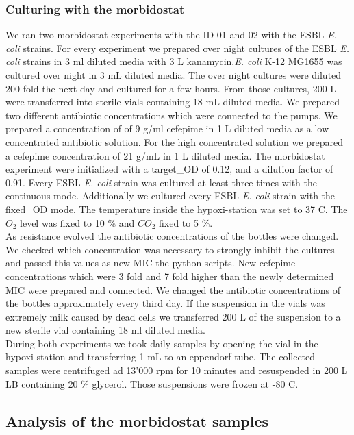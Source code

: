 \subsubsection{Culturing with the morbidostat}
We ran two morbidostat experiments with the ID 01 and 02 with the ESBL \textit{E. coli} strains. For every experiment we prepared over night cultures of the ESBL \textit{E. coli} strains in 3 ml diluted media with 3 \textmu L kanamycin.\textit{E. coli} K-12 MG1655 was cultured over night in 3 mL diluted media. The over night cultures were diluted 200 fold the next day and cultured for a few hours. From those cultures, 200 \textmu L were transferred into sterile vials containing 18 mL diluted media. We prepared two different antibiotic concentrations which were connected to the pumps. We prepared a concentration of of 9 \textmu g/ml cefepime in 1 L diluted media as a low concentrated antibiotic solution. For the high concentrated solution we prepared a cefepime concentration of 21 \textmu g/mL in 1 L diluted media. The morbidostat experiment were initialized with a target\_OD of 0.12, and a dilution factor of 0.91. Every ESBL \textit{E. coli} strain was cultured at least three times with the continuous mode. Additionally we cultured every ESBL \textit{E. coli} strain with the fixed\_OD mode. The temperature inside the hypoxi-station was set to 37 \degree C. The $O_2$ level was fixed to 10 \% and $CO_2$ fixed to 5 \%. \\
As resistance evolved the antibiotic concentrations of the bottles were changed. We checked which concentration was necessary to strongly inhibit the cultures and passed this values as new MIC the python scripts. New cefepime concentrations which were 3 fold and 7 fold higher than the newly determined MIC were prepared and connected. We changed the antibiotic concentrations of the bottles approximately every third day. If the suspension in the vials was extremely milk caused by dead cells we transferred 200 \textmu L of the suspension to a new sterile vial containing 18 ml diluted media.  \\
During both experiments we took daily samples by opening the vial in the hypoxi-station and transferring 1 mL to an eppendorf tube. The collected samples were centrifuged ad 13'000 rpm for 10 minutes and resuspended in 200 \textmu L LB containing 20 \% glycerol. Those suspensions were frozen at -80 \degree C.\\

\subsection{Analysis of the morbidostat samples}
